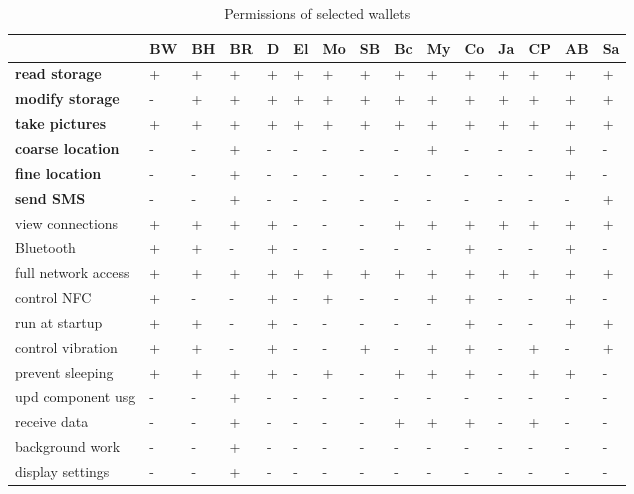 \begin{table*}
	\normalsize
	\caption{Permissions of selected wallets}
	\centering
	\begin{tabular}{ | l | l l l l l l l | l l l l l l l |}
		\hline
		& BW & BH & BR & D & El & Mo & SB & Bc & My & Co & Ja & CP & AB & Sa \\
		\hline
		\textbf{read storage} & + & + & + & + & + & + & + & + & + & + & + & + & + & + \\
		\textbf{modify storage} & - & + & + & + & + & + & + & + & + & + & + & + & + & + \\
		\textbf{take pictures} & + & + & + & + & + & + & + & + & + & + & + & + & + & + \\
		\textbf{coarse location} & - & - & + & - & - & - & - & - & + & - & - & - & + & - \\
		\textbf{fine location} & - & - & + & - & - & - & - & - & - & - & - & - & + & - \\
		\textbf{send SMS} & - & - & + & - & - & - & - & - & - & - & - & - & - & + \\
		view connections & + & + & + & + & - & - & - & + & + & + & + & + & + & + \\
		Bluetooth & + & + & - & + & - & - & - & - & - & + & - & - & + & - \\
		full network access & + & + & + & + & + & + & + & + & + & + & + & + & + & + \\
		control NFC & + & - & - & + & - & + & - & - & + & + & - & - & + & - \\
		run at startup & + & + & - & + & - & - & - & - & - & + & - & - & + & + \\
		control vibration & + & + & - & + & - & - & + & - & + & + & - & + & - & + \\
		prevent sleeping & + & + & + & + & - & + & - & + & + & + & - & + & + & - \\
		upd component usg & - & - & + & - & - & - & - & - & - & - & - & - & - & - \\
		receive data & - & - & + & - & - & - & - & + & + & + & - & + & - & - \\
		background work & - & - & + & - & - & - & - & - & - & - & - & - & - & - \\
		display settings & - & - & + & - & - & - & - & - & - & - & - & - & - & - \\

\end{tabular}
\end{table*}
